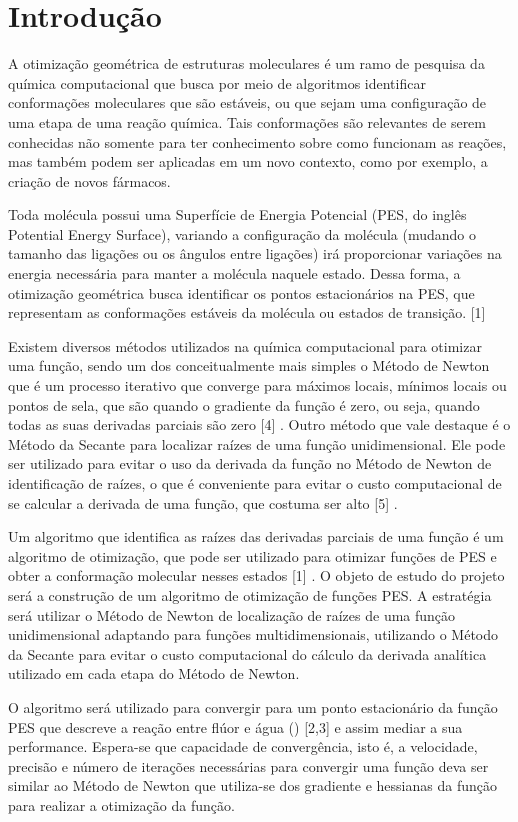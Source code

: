 \section{Introdução}

A otimização geométrica de estruturas moleculares é um ramo de pesquisa da química
computacional que busca por meio de algoritmos identificar conformações moleculares que
são estáveis, ou que sejam uma configuração de uma etapa de uma reação química. Tais
conformações são relevantes de serem conhecidas não somente para ter conhecimento sobre
como funcionam as reações, mas também podem ser aplicadas em um novo contexto, como
por exemplo, a criação de novos fármacos.

Toda molécula possui uma Superfície de Energia Potencial (PES, do inglês Potential
Energy Surface), variando a configuração da molécula (mudando o tamanho das ligações ou
os ângulos entre ligações) irá proporcionar variações na energia necessária para manter a
molécula naquele estado. Dessa forma, a otimização geométrica busca identificar os pontos
estacionários na PES, que representam as conformações estáveis da molécula ou estados de
transição. [1]

Existem diversos métodos utilizados na química computacional para otimizar uma
função, sendo um dos conceitualmente mais simples o Método de Newton que é um processo
iterativo que converge para máximos locais, mínimos locais ou pontos de sela, que são
quando o gradiente da função é zero, ou seja, quando todas as suas derivadas parciais são
zero [4] . Outro método que vale destaque é o Método da Secante para localizar raízes de uma
função unidimensional. Ele pode ser utilizado para evitar o uso da derivada da função no
Método de Newton de identificação de raízes, o que é conveniente para evitar o custo
computacional de se calcular a derivada de uma função, que costuma ser alto [5] .

Um algoritmo que identifica as raízes das derivadas parciais de uma função é um
algoritmo de otimização, que pode ser utilizado para otimizar funções de PES e obter a
conformação molecular nesses estados [1] . O objeto de estudo do projeto será a construção de
um algoritmo de otimização de funções PES. A estratégia será utilizar o Método de Newton
de localização de raízes de uma função unidimensional adaptando para funções
multidimensionais, utilizando o Método da Secante para evitar o custo computacional do
cálculo da derivada analítica utilizado em cada etapa do Método de Newton.

O algoritmo será utilizado para convergir para um ponto estacionário da função PES
que descreve a reação entre flúor e água () [2,3] e assim mediar a sua performance.
Espera-se que capacidade de convergência, isto é, a velocidade, precisão e número de
iterações necessárias para convergir uma função deva ser similar ao Método de Newton que
utiliza-se dos gradiente e hessianas da função para realizar a otimização da função.
